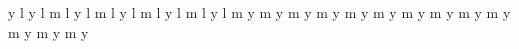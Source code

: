 {{{             \xmax \space \ymax \space \xmax \space \yymax\space y
             \xmax \space \yymin\space l
             \xmax \space \ymin \space \xxmax\space \ymin \space y
             \xmin \space \ymin \space l
           \or %
             \xmin \space \ymax \space m
             \xxmax\space \ymax \space l
             \xmax \space \ymax \space \xmax \space \yymax\space y
             \xmax\space  \ymin \space l
           \or %
             \xmax \space \ymax \space m
             \xmax \space \yymin\space l
             \xmax \space \ymin \space \xxmax\space \ymin \space y
             \xmin \space \ymin \space l
           \or %
             \xmax \space \ymin \space m
             \xxmin\space \ymin \space l
             \xmin \space \ymin \space \xmin \space \yymin\space y
             \xmin \space \ymax \space l
           \or %
             \xmin \space \ymin \space m
             \xmin \space \yymax\space l
             \xmin \space \ymax \space \xxmin\space \ymax \space y
             \xmax \space \ymax \space l
           \or %
             \xxmax\space \ymax \space m
             \xmax \space \ymax \space \xmax \space \yymax\space y
           \or %
             \xmax \space \yymin\space m
             \xmax \space \ymin \space \xxmax\space \ymin \space y
           \or %
             \xxmin\space \ymin \space m
             \xmin \space \ymin \space \xmin \space \yymin\space y
           \or %
             \xmin \space \yymax\space m
             \xmin \space \ymax \space \xxmin\space \ymax \space y
           \or %
             \xxmax\space \ymax \space m
             \xmax \space \ymax \space \xmax \space \yymax\space y
             \xmin \space \yymax\space m
             \xmin \space \ymax \space \xxmin\space \ymax \space y
           \or %
             \xxmax\space \ymax \space m
             \xmax \space \ymax \space \xmax \space \yymax\space y
             \xmax \space \yymin\space m
             \xmax \space \ymin \space \xxmax\space \ymin \space y
           \or %
             \xmax \space \yymin\space m
             \xmax \space \ymin \space \xxmax\space \ymin \space y
             \xxmin\space \ymin \space m
             \xmin \space \ymin \space \xmin \space \yymin\space y
           \or %
             \xxmin\space \ymin \space m
             \xmin \space \ymin \space \xmin \space \yymin\space y
             \xmin \space \yymax\space m
             \xmin \space \ymax \space \xxmin\space \ymax \space y
           \or %
             \xxmax\space \ymax \space m
             \xmax \space \ymax \space \xmax \space \yymax\space y
}}}

